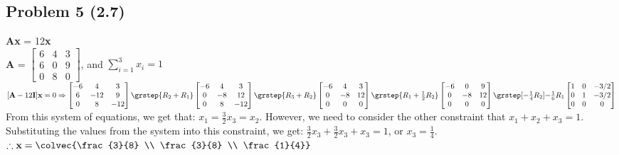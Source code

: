\documentclass{article}
\begin{document}
\subsection*{Problem 5 (2.7)}
	\textbf{Ax} = 12\textbf{x} \\
	\textbf{A} = $\begin{bmatrix} 6 & 4 & 3 \\  6 & 0 & 9 \\ 0 & 8 &  0\end{bmatrix}$, and $\sum_{i=1}^3 x_i = 1$ \\
	$
	[\textbf{A}-12\textbf{I}]\textbf{x} = 0 \Rightarrow
	\begin{bmatrix} -6 & 4 & 3 \\  6 & -12 & 9 \\ 0 & 8 &  -12 \end{bmatrix} 
	\grstep{R_2 + R_1}
	\begin{bmatrix} -6 & 4 & 3 \\  0 & -8 & 12 \\ 0 & 8 &  -12 \end{bmatrix}\\
	\grstep{R_3 + R_2} 
	\begin{bmatrix} -6 & 4 & 3 \\  0 & -8 & 12 \\ 0 & 0 &  0 \end{bmatrix}
	\grstep{R_1 + \frac{1}{2}R_2}
	\begin{bmatrix} -6 & 0 & 9 \\  0 & -8 & 12 \\ 0 & 0 &  0 \end{bmatrix}
	\grstep[-\frac{1}{4}R_2]{-\frac{1}{6}R_1}
	\begin{bmatrix} 1 & 0 & -3/2 \\  0 & 1 & -3/2 \\ 0 & 0 &  0 \end{bmatrix}
	$
	From this system of equations, we get that: $x_1 = \frac{3}{2}x_3 = x_2$. However, we need to consider the other constraint that $x_1 + x_2 + x_3 = 1$. Substituting the values 		from the system into this constraint, we get: $\frac{3}{2}x_3 + \frac{3}{2}x_3 + x_3 = 1$, or $x_3 = \frac{1}{4}$. $\therefore \textbf{x} = \colvec{\frac{3}{8} \\ 
	\frac{3}{8} \\ \frac{1}{4}}$
\end{document}
